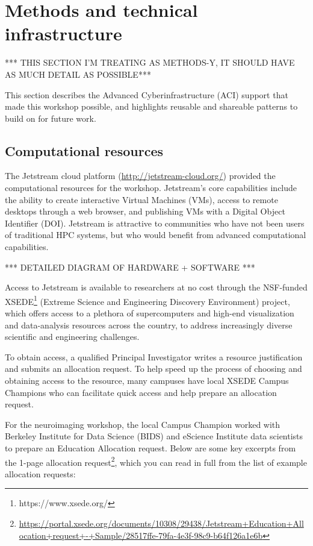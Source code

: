 \section{Methods and technical infrastructure}\label{sec:methods}

*** THIS SECTION I'M TREATING AS METHODS-Y, IT SHOULD HAVE AS MUCH DETAIL AS POSSIBLE***

This section describes the Advanced Cyberinfrastructure (ACI) support that made
this workshop possible, and highlights reusable and shareable patterns to build
on for future work.

\subsection{Computational resources}

The Jetstream\cite{Stewart2015Jetstream} cloud platform (\url{http://jetstream-cloud.org/}) provided the
computational resources for the workshop. Jetstream's core capabilities include
the ability to create interactive Virtual Machines (VMs), access to remote
desktops through a web browser, and publishing VMs with a Digital Object
Identifier (DOI). Jetstream is
attractive to communities who have not been users of traditional HPC systems,
but who would benefit from advanced computational capabilities.

*** DETAILED DIAGRAM OF HARDWARE + SOFTWARE ***

Access to Jetstream is available to researchers at no cost through the
NSF-funded XSEDE\footnote{https://www.xsede.org/} (Extreme Science and
Engineering Discovery Environment) project\cite{Towns2014XSEDE}, which offers access to a plethora of
supercomputers and high-end visualization and data-analysis resources across the
country, to address increasingly diverse scientific and engineering challenges.

To obtain access, a qualified Principal Investigator writes a resource justification and submits an
allocation request. To help speed up the process of choosing and obtaining
access to the resource, many campuses have local XSEDE Campus Champions who can
facilitate quick access and help prepare an allocation request.

For the neuroimaging workshop, the local Campus Champion worked with Berkeley
Institute for Data Science (BIDS) and
eScience Institute data scientists to prepare an Education Allocation request. Below are
some key excerpts from the 1-page allocation request\footnote{\url{https://portal.xsede.org/documents/10308/29438/Jetstream+Education+Allocation+request+-+Sample/28517ffe-79fa-4e3f-98c9-b64f126a1e6b}},
which you can read in full from the list of example allocation requests:

